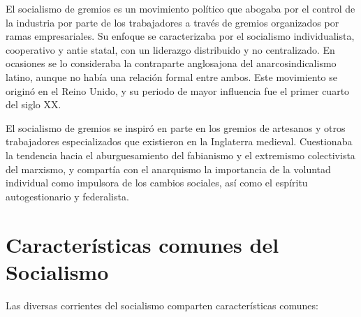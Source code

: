 \documentclass[
  jou,
  floatsintext,
  longtable,
  a4paper,
  nolmodern,
  notxfonts,
  notimes,
  12pt,
  colorlinks=true,linkcolor=blue,citecolor=blue,urlcolor=blue]{apa7}
\begin{document}
El socialismo de gremios es un movimiento político que abogaba por el
control de la industria por parte de los trabajadores a través de
gremios organizados por ramas empresariales. Su enfoque se caracterizaba
por el socialismo individualista, cooperativo y antie statal, con un
liderazgo distribuido y no centralizado. En ocasiones se lo consideraba
la contraparte anglosajona del anarcosindicalismo latino, aunque no
había una relación formal entre ambos. Este movimiento se originó en el
Reino Unido, y su periodo de mayor influencia fue el primer cuarto del
siglo XX.

El socialismo de gremios se inspiró en parte en los gremios de artesanos
y otros trabajadores especializados que existieron en la Inglaterra
medieval. Cuestionaba la tendencia hacia el aburguesamiento del
fabianismo y el extremismo colectivista del marxismo, y compartía con el
anarquismo la importancia de la voluntad individual como impulsora de
los cambios sociales, así como el espíritu autogestionario y
federalista.

\section{Características comunes del
Socialismo}\label{caracteruxedsticas-comunes-del-socialismo}

Las diversas corrientes del socialismo comparten características
comunes:
\end{document}
